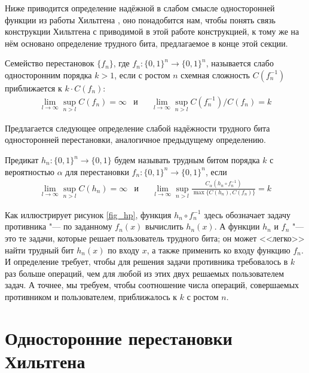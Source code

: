 \documentclass[a4paper, 14pt]{extarticle}
\begin{document}
Ниже приводится определение надёжной в слабом смысле односторонней функции из
работы Хильтгена \cite{hiltgen1993}, оно понадобится нам, чтобы понять связь
конструкции Хильтгена с приводимой в этой работе конструкцией, к тому же на нём
основано определение трудного бита, предлагаемое в конце этой секции.

\begin{definition}
Семейство перестановок $\{f_n\}$, где $f_n : \{0, 1\}^n \to \{0, 1\}^n$,
называется слабо односторонним порядка $k > 1$, если с ростом $n$ схемная
сложность $C(f_n^{-1})$ приближается к $k \cdot C(f_n)$:
\[
\begin{aligned}
&\lim_{l \to \infty} \sup_{n > l} C(f_n) = \infty
&
\text{и}&
&
\lim_{l \to \infty} \sup_{n > l} C(f_n^{-1}) / C(f_n) = k&
\end{aligned}
\]
\end{definition}

Предлагается следующее определение слабой надёжности трудного бита односторонней
перестановки, аналогичное предыдущему определению.

\begin{definition}
Предикат $h_n : \{0, 1\}^n \to \{0, 1\}$ будем называть трудным битом порядка
$k$ с вероятностью $\alpha$ для перестановки $f_n : \{0, 1\}^n \to \{0, 1\}^n$,
если
\[
\begin{aligned}
&\lim_{l \to \infty} \sup_{n > l} C(h_n) = \infty
&
\text{и}&
&
\lim_{l \to \infty} \sup_{n > l} \frac {C_\alpha(h_n \circ f_n^{-1})} {\max \{ C(h_n), C(f_n) \}} = k&
\end{aligned}
\]
\end{definition}

Как иллюстрирует рисунок \ref{fig_hp}, функция $h_n \circ f_n^{-1}$ здесь
обозначает задачу противника "--- по заданному $f_n(x)$ вычислить $h_n(x)$. А
функции $h_n$ и $f_n$ "--- это те задачи, которые решает пользователь трудного
бита; он может <<легко>> найти трудный бит $h_n(x)$ по входу $x$, а также
применить ко входу функцию $f_n$. И определение требует, чтобы для решения
задачи противника требовалось в $k$ раз больше операций, чем для любой из этих
двух решаемых пользователем задач. А точнее, мы требуем, чтобы соотношение числа
операций, совершаемых противником и пользователем, приближалось к $k$ с ростом
$n$.

\section{Односторонние перестановки Хильтгена}
\label{sec_hiltgen}
\end{document}
